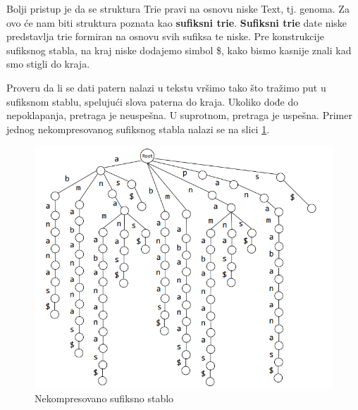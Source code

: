 Bolji pristup je da se struktura Trie pravi na osnovu niske Text, tj. genoma. Za ovo će nam biti struktura poznata kao \textbf{sufiksni trie}. \textbf{Sufiksni trie} date niske predstavlja trie formiran na osnovu svih sufiksa te niske. Pre konstrukcije sufiksnog stabla, na kraj niske dodajemo simbol \$, kako bismo kasnije znali kad smo stigli do kraja.

Proveru da li se dati patern nalazi u tekstu vršimo tako što tražimo put u sufiksnom stablu, spelujući slova paterna do kraja. Ukoliko dođe do nepoklapanja, pretraga je neuspešna. U suprotnom, pretraga je uspešna. Primer jednog nekompresovanog sufiksnog stabla nalazi se na slici \ref{nss}.


\begin{minipage}{\textwidth}
	\centering
	\begin{minipage}{0.45\textwidth}
		\begin{figure}[H]
			\centering
			\includegraphics[width=\textwidth]{poglavlja/9/slike/sufiksnoStabloNekompresovano.png}
			\caption{Nekompresovano sufiksno stablo}
			\label{nss}
		\end{figure} 
	\end{minipage}
	\hfill 
	\begin{minipage}{0.5\textwidth}
		\begin{figure}[H]
			\centering

\end{figure}
\end{minipage}
\end{minipage}
